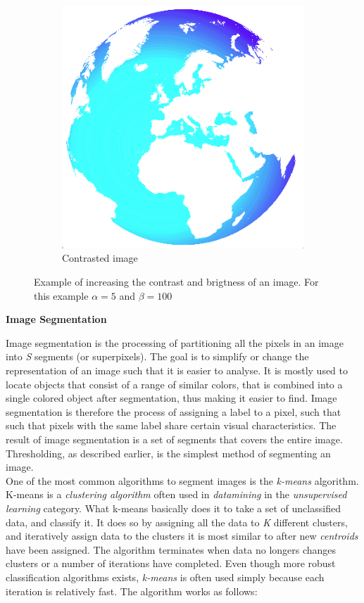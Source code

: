 \begin{figure}
\begin{subfigure}[b]{0.3\textwidth}
                \includegraphics[scale = 0.2]{img/globeContrast}
                \caption{Contrasted image}
        \end{subfigure}
		\caption{Example of increasing the contrast and brigtness of an image. For this example $\alpha = 5$ and $\beta = 100$}
		\label{fig:bright_contrast}
\end{figure}

\noindent \textbf{Image Segmentation} \par
Image segmentation is the processing of partitioning all the pixels in an image into \textit{S} segments (or superpixels). The goal is to simplify or change the representation of an image such that it is easier to analyse. It is mostly used to locate objects that consist of a range of similar colors, that is combined into a single colored object after segmentation, thus making it easier to find. Image segmentation is therefore the process of assigning a label to a pixel, such that such that pixels with the same label share certain visual characteristics. The result of image segmentation is a set of segments that covers the entire image. Thresholding, as described earlier, is the simplest method of segmenting an image. \\

One of the most common algorithms to segment images is the \textit{k-means} algorithm. K-means is a \textit{clustering algorithm} often used in \textit{datamining} in the \textit{unsupervised learning} category. What k-means basically does it to take a set of unclassified data, and classify it. It does so by assigning all the data to \textit{K} different clusters, and iteratively assign data to the clusters it is most similar to after new \textit{centroids} have been assigned. The algorithm terminates when data no longers changes clusters or a number of iterations have completed. Even though more robust classification algorithms exists, \textit{k-means} is often used simply because each iteration is relatively fast. The algorithm works as follows:

